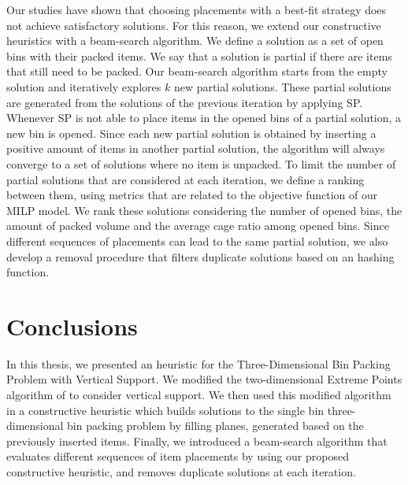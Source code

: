 \documentclass[11pt,a4paper,twocolumn]{article}
\begin{document}
Our studies have shown that choosing placements with a best-fit strategy does not achieve satisfactory solutions. For this reason, we extend our constructive heuristics with a beam-search algorithm. 
We define a solution as a set of open bins with their packed items. We say that a solution is partial if there are items that still need to be packed.
Our beam-search algorithm starts from the empty solution and iteratively explores $k$ new partial solutions.
These partial solutions are generated from the solutions of the previous iteration by applying SP. 
Whenever SP is not able to place items in the opened bins of a partial solution, a new bin is opened.
Since each new partial solution is obtained by inserting a positive amount of items in another partial solution, the algorithm will always converge to a set of solutions where no item is unpacked.
To limit the number of partial solutions that are considered at each iteration, we define a ranking between them, using metrics that are related to the objective function of our MILP model.
We rank these solutions considering the number of opened bins, the amount of packed volume and the average cage ratio among opened bins.
Since different sequences of placements can lead to the same partial solution, we also develop a removal procedure that filters duplicate solutions based on an hashing function.


\section{Conclusions}
In this thesis, we presented an heuristic for the Three-Dimensional Bin Packing Problem with Vertical Support.
We modified the two-dimensional Extreme Points algorithm of \citet{crainic2008extreme} to consider vertical support.
We then used this modified algorithm in a constructive heuristic which builds solutions to the single bin three-dimensional bin packing problem by filling planes, generated based on the previously inserted items.
Finally, we introduced a beam-search algorithm that evaluates different sequences of item placements by using our proposed constructive heuristic, and removes duplicate solutions at each iteration.
\end{document}
